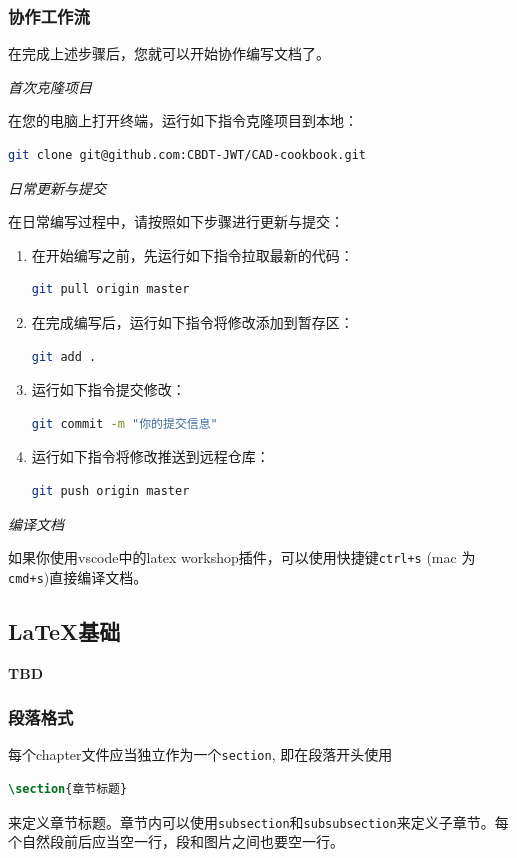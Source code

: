 \subsubsection{协作工作流}
在完成上述步骤后，您就可以开始协作编写文档了。

\noindent\emph{首次克隆项目}

在您的电脑上打开终端，运行如下指令克隆项目到本地：
\begin{lstlisting}[language=bash]
git clone git@github.com:CBDT-JWT/CAD-cookbook.git

\end{lstlisting}
\noindent\emph{日常更新与提交}

在日常编写过程中，请按照如下步骤进行更新与提交：
\begin{enumerate}
  \item 在开始编写之前，先运行如下指令拉取最新的代码：
\begin{lstlisting}[language=bash]
git pull origin master
\end{lstlisting}
    \item 在完成编写后，运行如下指令将修改添加到暂存区：
\begin{lstlisting}[language=bash]
git add .
\end{lstlisting}
    \item 运行如下指令提交修改：
\begin{lstlisting}[language=bash]
git commit -m "你的提交信息"
\end{lstlisting}
    \item 运行如下指令将修改推送到远程仓库：
\begin{lstlisting}[language=bash]
git push origin master
\end{lstlisting}
\end{enumerate}

\noindent\emph{编译文档}

如果你使用vscode中的latex workshop插件，可以使用快捷键{\tt ctrl+s} (mac 为{\tt cmd+s})直接编译文档。

\subsection{\LaTeX{}基础}
\begin{center}
    {\Huge \textbf{TBD}}
\end{center}

\subsubsection{段落格式}
每个chapter文件应当独立作为一个{\tt section}, 即在段落开头使用
\begin{lstlisting}[language=TeX]
\section{章节标题}
\end{lstlisting}
来定义章节标题。章节内可以使用{\tt subsection}和{\tt subsubsection}来定义子章节。每个自然段前后应当空一行，段和图片之间也要空一行。


